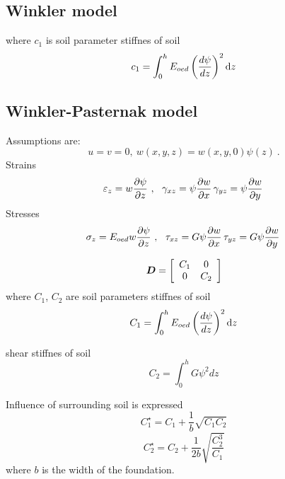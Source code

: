 \subsection{Winkler model}
where $c_1$ is soil parameter
stiffnes of soil
\begin{equation}
c_1 = \int_0^{h} E_{oed} \left(\frac{d\psi}{dz}\right)^2 {\rm d}z
\end{equation}

\subsection{Winkler-Pasternak model}
Assumptions are:
\begin{equation}
u=v=0,\ w(x,y,z)=w(x,y,0)\psi(z)\ .
\end{equation}
Strains
\begin{equation}
\varepsilon_z = w \ppd{\psi}{z}\ ,\ \
\gamma_{xz} = \psi \ppd{w}{x}\, 
\gamma_{yz} = \psi \ppd{w}{y}\, 
\end{equation}
Stresses
\begin{equation}
\sigma_z = E_{oed} w \mbox{$\displaystyle\frac{\partial{\psi}}{\partial{z}}$}\ ,\ \
\tau_{xz} = G \psi \mbox{$\displaystyle\frac{\partial{w}}{\partial{x}}$}\, 
\tau_{yz} = G \psi \mbox{$\displaystyle\frac{\partial{w}}{\partial{y}}$}\, 
\end{equation}

\begin{equation}
\mbox{\boldmath$D$} = \left[\begin{array}{cc} C_1 & 0 \\  0 & C_2 \end{array} \right]
\end{equation}
where $C_1$, $C_2$ are soil parameters
stiffnes of soil
\begin{equation}
C_1 = \int_0^{h} E_{oed} \left(\frac{d\psi}{dz}\right)^2 {\rm d}z
\end{equation}

shear stiffnes of soil
\begin{equation}
C_2 = \int_0^{h}{G \psi^2 } dz
\end{equation}

Influence of surrounding soil is expressed
\begin{equation}
C_1^{\star} = C_1 + \frac{1}{b} \sqrt{C_1 C_2}
\end{equation}
\begin{equation}
C_2^{\star} = C_2 + \frac{1}{2b} \sqrt{\frac{C_2^3}{C_1}}
\end{equation}
where $b$ is the width of the foundation.

